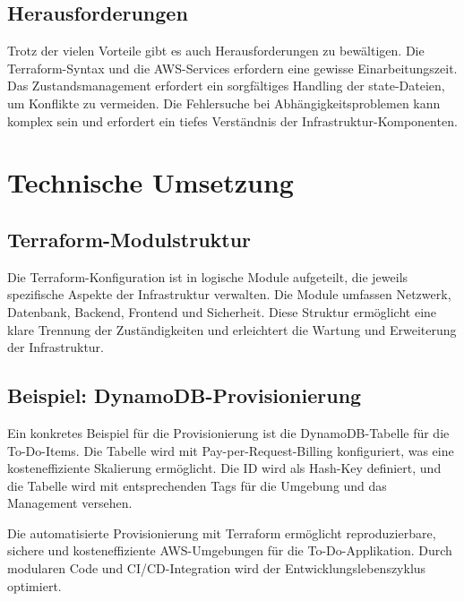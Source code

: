\subsection{Herausforderungen} 
Trotz der vielen Vorteile gibt es auch Herausforderungen zu bewältigen. 
Die Terraform-Syntax und die AWS-Services erfordern eine gewisse Einarbeitungszeit. 
Das Zustandsmanagement erfordert ein sorgfältiges Handling der state-Dateien, 
um Konflikte zu vermeiden. Die Fehlersuche bei Abhängigkeitsproblemen kann
komplex sein und erfordert ein tiefes Verständnis der Infrastruktur-Komponenten.

\section{Technische Umsetzung}
\subsection{Terraform-Modulstruktur}
Die Terraform-Konfiguration ist in logische Module aufgeteilt, die jeweils
spezifische Aspekte der Infrastruktur verwalten. Die Module umfassen Netzwerk,
Datenbank, Backend, Frontend und Sicherheit. Diese Struktur ermöglicht eine
klare Trennung der Zuständigkeiten und erleichtert die Wartung und Erweiterung
der Infrastruktur.

\subsection{Beispiel: DynamoDB-Provisionierung}
Ein konkretes Beispiel für die Provisionierung ist die DynamoDB-Tabelle für die To-Do-Items.
Die Tabelle wird mit Pay-per-Request-Billing konfiguriert, was eine kosteneffiziente
Skalierung ermöglicht. Die ID wird als Hash-Key definiert, und die Tabelle
wird mit entsprechenden Tags für die Umgebung und das Management versehen.

Die automatisierte Provisionierung mit Terraform ermöglicht reproduzierbare,
sichere und kosteneffiziente AWS-Umgebungen für die To-Do-Applikation. Durch
modularen Code und CI/CD-Integration wird der Entwicklungslebenszyklus
optimiert.
